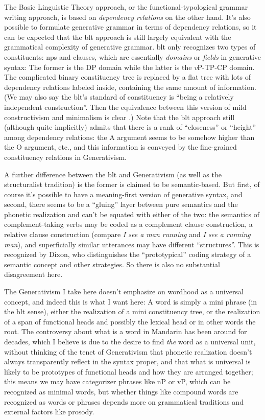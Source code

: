 \documentclass[UTF8, a4paper, oneside, scheme=plain]{ctexrep}
\newcommand*{\term}[1]{\emph{#1}}
\newcommand{\corpus}[1]{\emph{#1}}
\newcommand{\vP}{\textit{v}P}
\begin{document}
The Basic Linguistic Theory approach, 
or the functional-typological grammar writing approach,
is based on \emph{dependency relations} on the other hand.
It's also possible to formulate generative grammar in terms of dependency relations,
so it can be expected that the \acs{blt} approach is still largely equivalent 
with the grammatical complexity of generative grammar.
\acs{blt} only recognizes two types of constituents:
\acs{np}s and clauses,
which are essentially \term{domains} or \term{fields} in generative syntax:
The former is the DP domain while the latter is the \vP{}-TP-CP domain.
The complicated binary constituency tree is replaced by a flat tree 
with lots of dependency relations labeled inside,
containing the same amount of information.
(We may also say the \acl{blt}'s standard of constituency 
is ``being a relatively independent construction''. 
Then the equivalence between this version of mild constructivism and minimalism 
is clear \citep{construction-minimalism}.)
Note that the \acl{blt} approach still (although quite implicitly) admits 
that there is a rank of ``closeness'' or ``height'' among dependency relations: 
the A argument seems to be somehow higher than the O argument, etc.,
and this information is conveyed by the fine-grained constituency relations 
in Generativism.

A further difference between the \acl{blt} and Generativism (as well as the structuralist tradition)
is the former is claimed to be semantic-based.
But first, of course it's possible to have a meaning-first version of generative syntax,
and second,
there seems to be a ``gluing'' layer between pure semantics and 
the phonetic realization 
and can't be equated with either of the two: 
the semantics of complement-taking verbs 
may be coded as a complement clause construction, 
a relative clause construction 
(compare \corpus{I see a man running} and \corpus{I see a running man}),
and superficially similar utterances may have different ``structures''.
This is recognized by Dixon, 
who distinguishes the ``prototypical'' coding strategy of a semantic concept 
and other strategies.
So there is also no substantial disagreement here.

The Generativism I take here doesn't emphasize on wordhood as a universal concept,
and indeed this is what I want here:
A word is simply a mini phrase (in the \acs{blt} sense),
either the realization of a mini constituency tree,
or the realization of a span of functional heads 
and possibly the lexical head or in other words the root.
The controversy about what is a word in Mandarin 
has been around for decades,
which I believe is due to the desire to 
find \emph{the} word as a universal unit,
without thinking of the tenet of Generativism 
that phonetic realization doesn't always 
transparently reflect in the syntax proper,
and that what is universal is likely to be 
prototypes of functional heads and how they are arranged together;
this means we may have categorizer phrases like nP or vP,
which can be recognized as minimal words,
but whether things like compound words are recognized as words or phrases 
depends more on grammatical traditions
and external factors like prosody.
\end{document}
